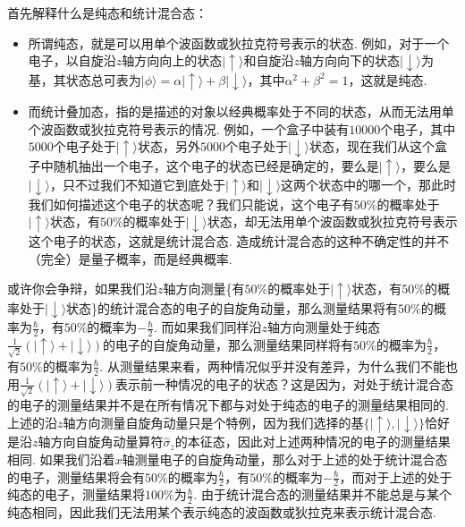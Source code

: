 \documentclass{assignment}
\begin{document}
首先解释什么是纯态和统计混合态：
\begin{itemize}
    \item 所谓纯态，就是可以用单个波函数或狄拉克符号表示的状态. 例如，对于一个电子，以自旋沿$z$轴方向向上的状态$\lvert\uparrow\rangle$和自旋沿$z$轴方向向下的状态$\lvert\downarrow\rangle$为基，其状态总可表为$\lvert\phi\rangle=\alpha\lvert\uparrow\rangle+\beta\lvert\downarrow\rangle$，其中$\alpha^2+\beta^2=1$，这就是纯态.
    \item 而统计叠加态，指的是描述的对象以经典概率处于不同的状态，从而无法用单个波函数或狄拉克符号表示的情况. 例如，一个盒子中装有$10000$个电子，其中$5000$个电子处于$\lvert\uparrow\rangle$状态，另外$5000$个电子处于$\lvert\downarrow\rangle$状态，现在我们从这个盒子中随机抽出一个电子，这个电子的状态已经是确定的，要么是$\lvert\uparrow\rangle$，要么是$\lvert\downarrow\rangle$，只不过我们不知道它到底处于$\lvert\uparrow\rangle$和$\lvert\downarrow\rangle$这两个状态中的哪一个，那此时我们如何描述这个电子的状态呢？我们只能说，这个电子有$50\%$的概率处于$\lvert\uparrow\rangle$状态，有$50\%$的概率处于$\lvert\downarrow\rangle$状态，却无法用单个波函数或狄拉克符号表示这个电子的状态，这就是统计混合态. 造成统计混合态的这种不确定性的并不（完全）是量子概率，而是经典概率.
\end{itemize}

或许你会争辩，如果我们沿$z$轴方向测量\{有$50\%$的概率处于$\lvert\uparrow\rangle$状态，有$50\%$的概率处于$\lvert\downarrow\rangle$状态\}的统计混合态的电子的自旋角动量，那么测量结果将有$50\%$的概率为$\frac{\hbar}{2}$，有$50\%$的概率为$-\frac{\hbar}{2}$. 而如果我们同样沿$z$轴方向测量处于纯态$\frac{1}{\sqrt{2}}(\lvert\uparrow\rangle+\lvert\downarrow\rangle)$的电子的自旋角动量，那么测量结果同样将有$50\%$的概率为$\frac{\hbar}{2}$，有$50\%$的概率为$\frac{\hbar}{2}$. 从测量结果来看，两种情况似乎并没有差异，为什么我们不能也用$\frac{1}{\sqrt{2}}(\lvert\uparrow\rangle+\lvert\downarrow\rangle)$表示前一种情况的电子的状态？这是因为，对处于统计混合态的电子的测量结果并不是在所有情况下都与对处于纯态的电子的测量结果相同的. 上述的沿$z$轴方向测量自旋角动量只是个特例，因为我们选择的基$\{\lvert\uparrow\rangle,\lvert\downarrow\rangle\}$恰好是沿$z$轴方向自旋角动量算符$\hat{\sigma}_z$的本征态，因此对上述两种情况的电子的测量结果相同. 如果我们沿着$x$轴测量电子的自旋角动量，那么对于上述的处于统计混合态的电子，测量结果将会有$50\%$的概率为$\frac{\hbar}{2}$，有$50\%$的概率为$-\frac{\hbar}{2}$，而对于上述的处于纯态的电子，测量结果将$100\%$为$\frac{\hbar}{2}$. 由于统计混合态的测量结果并不能总是与某个纯态相同，因此我们无法用某个表示纯态的波函数或狄拉克来表示统计混合态.
\end{document}
